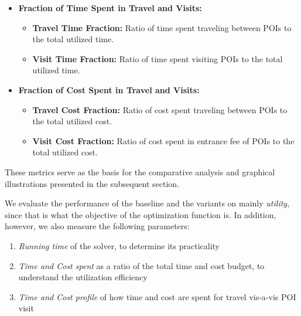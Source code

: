 {\begin{itemize}
    
    
    \item \textbf{Fraction of Time Spent in Travel and Visits:}
    \begin{itemize}
        \item \textbf{Travel Time Fraction:} Ratio of time spent traveling between POIs to the total utilized time.
        \item \textbf{Visit Time Fraction:} Ratio of time spent visiting POIs to the total utilized time.
    \end{itemize}

    \item \textbf{Fraction of Cost Spent in Travel and Visits:}
    \begin{itemize}
        \item \textbf{Travel Cost Fraction:} Ratio of cost spent traveling between POIs to the total utilized cost.
        \item \textbf{Visit Cost Fraction:} Ratio of cost spent in entrance fee of POIs to the total utilized cost.
    \end{itemize}
\end{itemize}


These metrics serve as the basis for the comparative analysis and graphical illustrations presented in the subsequent section.

}

We evaluate the performance of the baseline and the \trip variants on mainly \emph{utility}, since that is what the objective of the optimization function is.
In addition, however, we also measure the following parameters:

\begin{enumerate}
    \item \emph{Running time} of the solver, to determine its practicality
    \item \emph{Time and Cost spent} as a ratio of the total time and cost budget, to understand the utilization efficiency
    \item \emph{Time and Cost profile} of how time and cost are spent for travel vis-a-vis POI visit
\end{enumerate}

